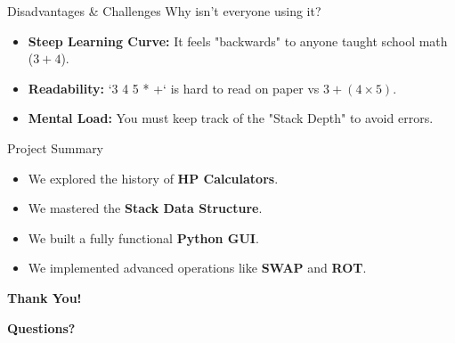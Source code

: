 \documentclass[aspectratio=169]{beamer} %
\begin{document}
	\begin{frame}{Disadvantages \& Challenges}
		Why isn't everyone using it?
		\vspace{0.3cm}
		\begin{itemize}
			\item[\textcolor{red}{$\times$}] \textbf{Steep Learning Curve:} It feels "backwards" to anyone taught school math ($3+4$).
			\item[\textcolor{red}{$\times$}] \textbf{Readability:} `3 4 5 * +` is hard to read on paper vs $3 + (4 \times 5)$.
			\item[\textcolor{red}{$\times$}] \textbf{Mental Load:} You must keep track of the "Stack Depth" to avoid errors.
		\end{itemize}
	\end{frame}
	
	\begin{frame}{Project Summary}
		\begin{itemize}
			\item We explored the history of \textbf{HP Calculators}.
			\item We mastered the \textbf{Stack Data Structure}.
			\item We built a fully functional \textbf{Python GUI}.
			\item We implemented advanced operations like \textbf{SWAP} and \textbf{ROT}.
		\end{itemize}
	\end{frame}
	
	\begin{frame}
		\centering
		\vspace{1.5cm}
		\Huge \textbf{Thank You!}
		
		\vspace{1cm}
		\normalsize
		\textbf{Questions?}
	\end{frame}
	
\end{document}
